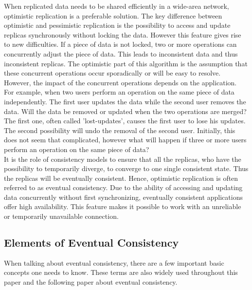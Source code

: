 \documentclass[a4paper,12pt]{report}
\begin{document}
When replicated data needs to be shared efficiently in a wide-area network, optimistic replication is a preferable solution. The key difference between optimistic and pessimistic replication is the possibility to access and update replicas synchronously without locking the data. However this feature gives rise to new difficulties. If a piece of data is not locked, two or more operations can concurrently adjust the piece of data. This leads to inconsistent data and thus inconsistent replicas. The optimistic part of this algorithm is the assumption that these concurrent operations occur sporadically or will be easy to resolve. However, the impact of the concurrent operations depends on the application. \\
\indent For example, when two users perform an operation on the same piece of data independently. The first user updates the data while the second user removes the data. Will the data be removed or updated when the two operations are merged? The first one, often called 'lost-updates', causes the first user to lose his updates. The second possibility will undo the removal of the second user. Initially, this does not seem that complicated, however what will happen if three or more users perform an operation on the same piece of data? \\
It is the role of consistency models to ensure that all the replicas, who have the possibility to temporarily diverge, to converge to one single consistent state. Thus the replicas will be eventually consistent. Hence, optimistic replication is often referred to as eventual consistency. Due to the ability of accessing and updating data concurrently without first synchronizing, eventually consistent applications offer high availability. This feature makes it possible to work with an unreliable or temporarily unavailable connection. \\



\subsection{Elements of Eventual Consistency}\label{sec:Elements}

When talking about eventual consistency, there are a few important basic concepts one needs to know. These terms are also widely used throughout this paper and the following paper about eventual consistency. 
\newline
\end{document}
